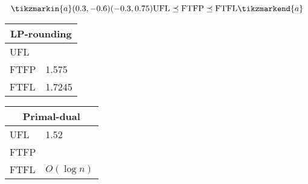 \documentclass[hyperref,dvipsnames,svgnames]{beamer}
\begin{document}
\begin{frame}
  \vspace{.3in}
  \large{
  \begin{equation*}
    \tikzmarkin{a}(0.3,-0.6)(-0.3,0.75)
    \text{UFL} \preceq \text{FTFP} \preceq \text{FTFL}
    \tikzmarkend{a}
  \end{equation*}
  }
  \begin{minipage}{.45\linewidth}
  \vspace{.3in}
  \begin{center}
    \begin{tabular}{l l}
      \multicolumn{2}{c}{LP-rounding}\\
      \hline
      \rowcolor{GreenYellow}
      UFL & \\
      \rowcolor{GreenYellow}
      FTFP & \multirow{-2}{*}{1.575}\\
      \rowcolor{Cyan}
      FTFL & 1.7245\\
    \end{tabular}
    \end{center}
  \end{minipage}
  \begin{minipage}{.45\linewidth}
  \vspace{.3in}
  \begin{center}
    \begin{tabular}{l l}
      \multicolumn{2}{c}{Primal-dual}\\
      \hline
      \rowcolor{GreenYellow}
      UFL & 1.52\\
      \rowcolor{Cyan}
      FTFP & \\
      \rowcolor{Cyan}
      FTFL & \multirow{-2}{*}{$O(\log n)$}\\
    \end{tabular}
    \end{center}
  \end{minipage}
\end{frame}
\end{document}
